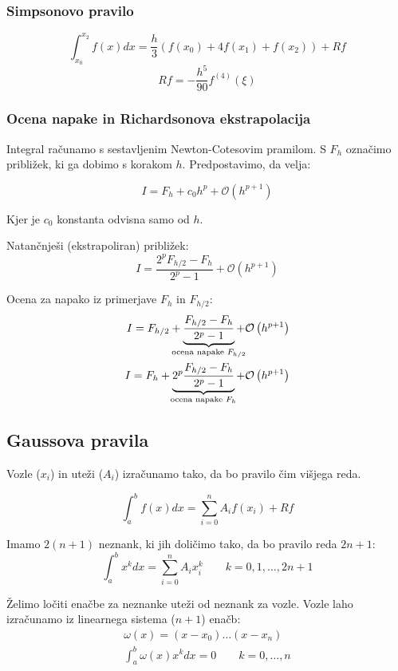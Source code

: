 \begin{multicols}{5}
\subsubsection*{Simpsonovo pravilo}
\[ \int_{x_0}^{x_2} f(x) dx = \frac{h}{3} (f(x_0) + 4f(x_1) + f(x_2)) + Rf\]
\[ Rf = -\frac{h^5}{90} f^{(4)}(\xi)\]

\subsubsection*{Ocena napake in Richardsonova ekstrapolacija}
Integral računamo s sestavljenim Newton-Cotesovim pramilom. S $F_h$ označimo približek, ki ga dobimo s 
korakom $h$. Predpostavimo, da velja:

\[ I = F_h + c_0 h^p + \mathcal{O}\left( h^{p+1} \right)\]

Kjer je $c_0$ konstanta odvisna samo od $h$.

Natančnješi (ekstrapoliran) približek:
\[ I = \frac{2^p F_{h/2} - F_h}{2^p - 1} + \mathcal{O}\left(h^{p+1}\right)\]

Ocena za napako iz primerjave $F_h$ in $F_{h/2}$:
\begin{align*}
    I = F_{h/2} + \underbrace{\frac{F_{h/2} - F_h}{2^p - 1}}_{\mathclap{\text{ocena napake $F_{h/2}$}}} + \mathcal{O}\left( h^{p+1} \right) \\
    I = F_{h} + \underbrace{2^p\frac{F_{h/2} - F_h}{2^p - 1}}_{\mathclap{\text{ocena napake $F_{h}$}}} + \mathcal{O}\left( h^{p+1} \right) \\
\end{align*}
\subsection*{Gaussova pravila}
Vozle ($x_i$) in uteži ($A_i$) izračunamo tako, da bo pravilo čim višjega reda.

\[ \int_a^b f(x) dx = \sum_{i=0}^n A_i f(x_i) + Rf \]

Imamo $2(n+1)$ neznank, ki jih doličimo tako, da bo pravilo reda $2n+1$:
\[ \int_a^b x^k dx = \sum_{i=0}^n A_i x_i^k \qquad k=0,1,\dots, 2n+1\]

Želimo ločiti enačbe za neznanke uteži od neznank za vozle. Vozle laho izračunamo iz linearnega sistema ($n+1$) enačb:
\begin{align*}
    \omega(x) = (x-x_0)\dots (x-x_n) \\
    \int_a^b \omega(x) x^k dx = 0 \qquad k = 0,\dots, n
\end{align*}


\end{multicols}
